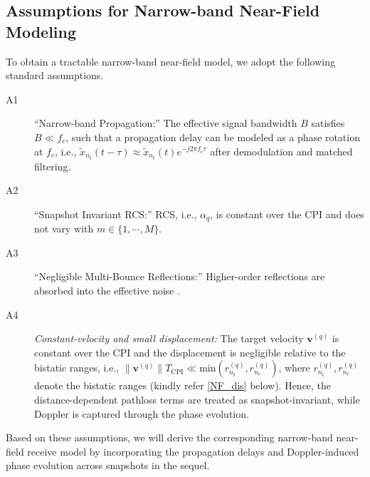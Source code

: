 \documentclass[9pt,final,journal,twocolumn]{IEEEtran}
\begin{document}
\subsection{Assumptions for Narrow-band Near-Field Modeling}
To obtain a tractable narrow-band near-field model, we adopt the following standard assumptions.
\begin{description}
\item[A1] ``Narrow-band Propagation:'' The effective signal bandwidth $B$ satisfies $B\ll f_c$, such that a propagation delay can be modeled as a phase rotation at $f_c$, i.e., $\widetilde{x}_{n_t}(t-\tau)\approx \widetilde{x}_{n_t}(t)e^{-j2\pi f_c\tau}$ after demodulation and matched filtering.
\item[A2] ``Snapshot Invariant RCS:'' RCS, i.e., $\alpha_q$, is constant over the CPI and does not vary with $m\in\{1,\cdots,M\}$.
\item[A3] ``Negligible Multi-Bounce Reflections:'' Higher-order reflections are absorbed into the effective noise \cite{xu2023bandwidth}.
\item[A4] \emph{Constant-velocity and small displacement:}
The target velocity ${\bm v}^{(q)}$ is constant over the CPI and the displacement is negligible relative to the bistatic ranges, i.e.,
$\|{\bm v}^{(q)}\|T_{\mathrm{CPI}} \ll \mathrm{min} \left(r_{n_t}^{(q)}, r_{n_r}^{(q)}\right)$, where $r_{n_t}^{(q)}, r_{n_r}^{(q)}$
denote the bistatic ranges (kindly refer \eqref{NF_dis} below). Hence, the distance-dependent pathloss terms are treated as snapshot-invariant, while Doppler is captured through the phase evolution.
\end{description}
%
Based on these assumptions, we will derive the corresponding narrow-band near-field receive model by incorporating the propagation delays and Doppler-induced phase evolution across snapshots in the sequel.
%
\end{document}
